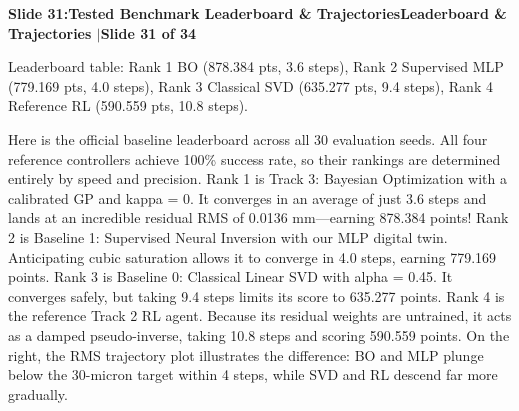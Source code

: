 \documentclass[11pt,a4paper]{article}
\begin{document}
\noindent\begin{tcolorbox}[colback=navy,colframe=navy,left=6pt,right=6pt,top=3pt,bottom=3pt,boxrule=0pt,arc=2pt]
{\large\bfseries\color{white}Slide 31:\enspace Tested Benchmark Leaderboard \& Trajectories}\hfill{\footnotesize\bfseries\color{white!85!lightbg}Leaderboard \& Trajectories \enspace$|$\enspace Slide 31 of 34}
\end{tcolorbox}
\vspace{0.2em}
\begin{tcolorbox}[colback=lightbg,colframe=bordergray,title={\footnotesize\bfseries\color{darkgray}Slide Visual Blueprint},fontupper=\small,left=6pt,right=6pt,top=2.5pt,bottom=2.5pt,boxrule=0.6pt,arc=2.5pt]
Leaderboard table: Rank 1 BO (878.384 pts, 3.6 steps), Rank 2 Supervised MLP (779.169 pts, 4.0 steps), Rank 3 Classical SVD (635.277 pts, 9.4 steps), Rank 4 Reference RL (590.559 pts, 10.8 steps).
\end{tcolorbox}
\vspace{0.2em}
\begin{tcolorbox}[colback=white,colframe=primaryblue,title={\footnotesize\bfseries\color{white}Spoken Presenter Script},fontupper=\small,left=6pt,right=6pt,top=3pt,bottom=3pt,boxrule=0.8pt,arc=2.5pt]
Here is the official baseline leaderboard across all 30 evaluation seeds. All four reference controllers achieve 100\% success rate, so their rankings are determined entirely by speed and precision. Rank 1 is Track 3: Bayesian Optimization with a calibrated GP and kappa = 0. It converges in an average of just 3.6 steps and lands at an incredible residual RMS of 0.0136 mm—earning 878.384 points! Rank 2 is Baseline 1: Supervised Neural Inversion with our MLP digital twin. Anticipating cubic saturation allows it to converge in 4.0 steps, earning 779.169 points. Rank 3 is Baseline 0: Classical Linear SVD with alpha = 0.45. It converges safely, but taking 9.4 steps limits its score to 635.277 points. Rank 4 is the reference Track 2 RL agent. Because its residual weights are untrained, it acts as a damped pseudo-inverse, taking 10.8 steps and scoring 590.559 points. On the right, the RMS trajectory plot illustrates the difference: BO and MLP plunge below the 30-micron target within 4 steps, while SVD and RL descend far more gradually.
\end{tcolorbox}
\vspace{0.2em}
\end{document}
